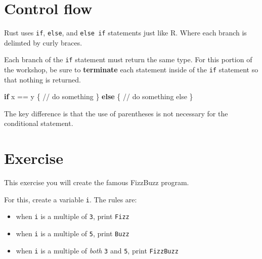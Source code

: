 \documentclass[
  letterpaper,
  DIV=11,
  numbers=noendperiod,
  oneside]{scrreprt}
\newenvironment{Shaded}{\begin{snugshade}}{\end{snugshade}}
\newcommand{\CommentTok}[1]{\textcolor[rgb]{0.37,0.37,0.37}{#1}}
\newcommand{\ControlFlowTok}[1]{\textcolor[rgb]{0.00,0.23,0.31}{\textbf{#1}}}
\newcommand{\NormalTok}[1]{\textcolor[rgb]{0.00,0.23,0.31}{#1}}
\newcommand{\OperatorTok}[1]{\textcolor[rgb]{0.37,0.37,0.37}{#1}}
\providecommand{\tightlist}{%
  \setlength{\itemsep}{0pt}\setlength{\parskip}{0pt}}\usepackage{longtable,booktabs,array}
\begin{document}
\section{Control flow}\label{control-flow-1}

Rust uses \texttt{if}, \texttt{else}, and \texttt{else\ if} statements
just like R. Where each branch is delimted by curly braces.

\begin{tcolorbox}[enhanced jigsaw, titlerule=0mm, coltitle=black, opacitybacktitle=0.6, bottomrule=.15mm, bottomtitle=1mm, colframe=quarto-callout-warning-color-frame, toprule=.15mm, opacityback=0, rightrule=.15mm, leftrule=.75mm, breakable, left=2mm, colback=white, colbacktitle=quarto-callout-warning-color!10!white, toptitle=1mm, title=\textcolor{quarto-callout-warning-color}{\faExclamationTriangle}\hspace{0.5em}{Warning}, arc=.35mm]

Each branch of the \texttt{if} statement must return the same type. For
this portion of the workshop, be sure to \textbf{terminate} each
statement inside of the \texttt{if} statement so that nothing is
returned.

\end{tcolorbox}

\begin{Shaded}
\begin{Highlighting}[]
\ControlFlowTok{if}\NormalTok{ x }\OperatorTok{==}\NormalTok{ y }\OperatorTok{\{}
  \CommentTok{// do something}
\OperatorTok{\}} \ControlFlowTok{else} \OperatorTok{\{}
  \CommentTok{// do something else}
\OperatorTok{\}}
\end{Highlighting}
\end{Shaded}

The key difference is that the use of parentheses is not necessary for
the conditional statement.

\section{Exercise}\label{exercise-1}

This exercise you will create the famous FizzBuzz program.

For this, create a variable \texttt{i}. The rules are:

\begin{itemize}
\tightlist
\item
  when \texttt{i} is a multiple of \texttt{3}, print \texttt{Fizz}
\item
  when \texttt{i} is a multiple of \texttt{5}, print \texttt{Buzz}
\item
  when \texttt{i} is a multiple of \emph{both} \texttt{3} and
  \texttt{5}, print \texttt{FizzBuzz}
\end{itemize}
\end{document}
